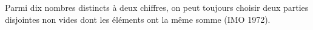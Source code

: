Parmi dix nombres distincts à deux chiffres, on peut toujours choisir deux parties disjointes non vides dont les éléments ont la même somme (IMO 1972).
